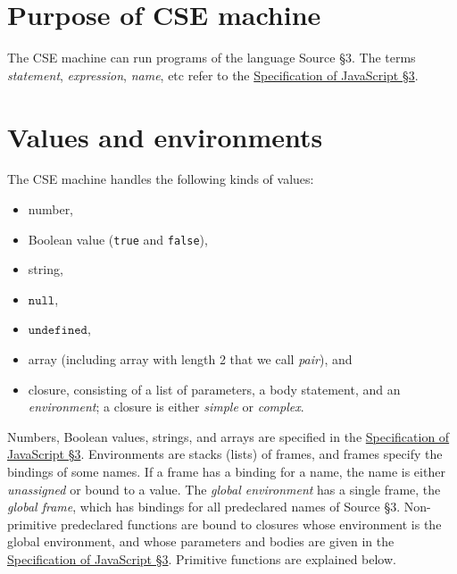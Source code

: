 



\section{Purpose of CSE machine}

The CSE machine can run programs of the language Source \S 3.
The terms \emph{statement}, \emph{expression},
\emph{name}, etc refer to the 
\href{https://docs.sourceacademy.org/javascript/javascript_3.pdf}{\color{blue}Specification of JavaScript \S 3}.

\section{Values and environments}

The CSE machine handles the following kinds of values:
\begin{itemize}
\item number,
\item Boolean value (\lstinline{true} and \lstinline{false}),
\item string,
\item $\texttt{null}$,
\item $\texttt{undefined}$,
\item array (including array with length 2 that we call \emph{pair}), and
\item closure, consisting of a list of parameters, a body statement, and an \emph{environment};
a closure is either \emph{simple} or \emph{complex}.
\end{itemize}
Numbers, Boolean values, strings, and arrays are specified in the
\href{https://docs.sourceacademy.org/javascript/javascript_3.pdf}{\color{blue}Specification of JavaScript \S 3}.
Environments are stacks (lists) of frames, and frames specify the bindings of some names.
If a frame has a binding for a name, the name is either \emph{unassigned} or
bound to a value.
The \emph{global environment} has a single frame, the \emph{global frame}, which has
bindings for all predeclared names of Source \S 3.
Non-primitive predeclared functions are bound to closures whose environment is the global environment,
and whose parameters and bodies are given in the
\href{https://docs.sourceacademy.org/javascript/javascript_3.pdf}{\color{blue}Specification of JavaScript \S 3}.
Primitive functions are explained below.

